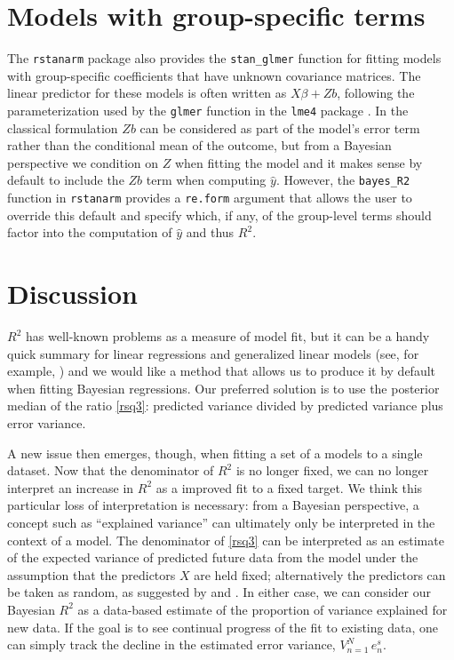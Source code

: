 \documentclass[11pt]{article}
\begin{document}
\section{Models with group-specific terms}
The {\tt rstanarm} package also provides the \verb#stan_glmer# function for
fitting models with group-specific coefficients that have unknown covariance
matrices. The linear predictor for these models is often written as
$X \beta + Zb$, following the parameterization used by the \verb#glmer#
function in the {\tt lme4} package \citep{lme4Rpackage}. In the classical
formulation $Zb$ can be considered as part of the model's error term rather than
the conditional mean of the outcome, but from a Bayesian perspective we
condition on $Z$ when fitting the model and it makes sense by default to include
the $Zb$ term when computing $\hat{y}$. However, the \verb#bayes_R2# function in
{\tt rstanarm} provides a {\tt re.form} argument that allows the user to
override this default and specify which, if any, of the group-level terms should
factor into the computation of $\hat{y}$ and thus $R^2$.

\section{Discussion}
$R^2$ has well-known problems as a measure of model fit, but it can be a handy
quick summary for linear regressions and generalized linear models (see, for
example, \cite{HuPaltaShao2006}) and we would like a method that allows us 
to produce it by default when fitting Bayesian regressions.  Our preferred solution 
is to use the posterior median of the ratio \eqref{rsq3}:  predicted variance divided by
predicted variance plus error variance.

A new issue then emerges, though, when fitting a set of a models to a single
dataset.  Now that the denominator of $R^2$ is no longer fixed, we can no longer
interpret an increase in $R^2$ as a improved fit to a fixed target.  We think
this particular loss of interpretation is necessary:  from a Bayesian
perspective, a concept such as ``explained variance'' can ultimately only be
interpreted in the context of a model.  The denominator of \eqref{rsq3} can be
interpreted as an estimate of the expected variance of predicted future data
from the model under the assumption that the predictors $X$ are held fixed;
alternatively the predictors can be taken as random, as suggested by
\cite{Helland1987} and \cite{Tjur2009}.  In either case, we can consider our
Bayesian $R^2$ as a data-based estimate of the proportion of variance explained
for new data. If the goal is to see continual progress of the fit to existing
data, one can simply track the decline in the estimated error variance,
$V_{n=1}^N \,e_n^s$.
\end{document}
